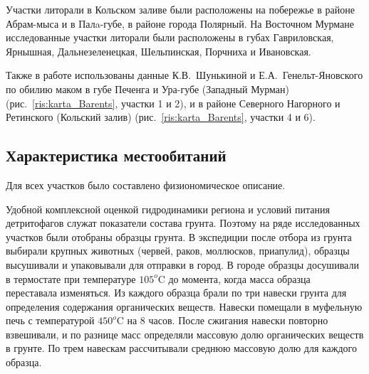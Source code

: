 Участки литорали  в   Кольском   заливе   были  расположены на побережье в районе Абрам-мыса и в Палa-губе, в районе города Полярный. 
На   Восточном   Мурмане исследованные участки литорали  были   расположены   в   губах   Гавриловская,  Ярнышная, Дальнезеленецкая, Шельпинская, Порчниха и Ивановская.

Также в работе использованы данные К.\:В.~Шунькиной и Е.\:А.~Генельт-Яновского по обилию маком в губе Печенга и Ура-губе (Западный Мурман) (рис.~\ref{ris:karta_Barents}, участки 1 и 2), и в районе Северного Нагорного и Ретинского (Кольский залив) (рис.~\ref{ris:karta_Barents}, участки 4 и 6).



    \subsection{Характеристика местообитаний}
Для всех участков было составлено физиономическое описание.

Удобной комплексной оценкой гидродинамики региона и условий питания детритофагов служат показатели состава грунта. 
Поэтому на ряде исследованных участков были отобраны образцы грунта. 
В экспедиции после отбора из грунта выбирали крупных животных (червей, раков, моллюсков, приапулид), образцы высушивали и упаковывали для отправки в город. 
В городе образцы досушивали в термостате при температуре $105^o$C до момента, когда масса образца переставала изменяться. 
Из каждого образца брали по три навески грунта для определения содержания органических веществ. 
Навески помещали в муфельную печь с температурой $450^o$C на $8$ часов. 
После сжигания навески повторно взвешивали, и по разнице масс определяли массовую долю органических веществ в грунте. 
По трем навескам рассчитывали среднюю массовую долю для каждого образца.


